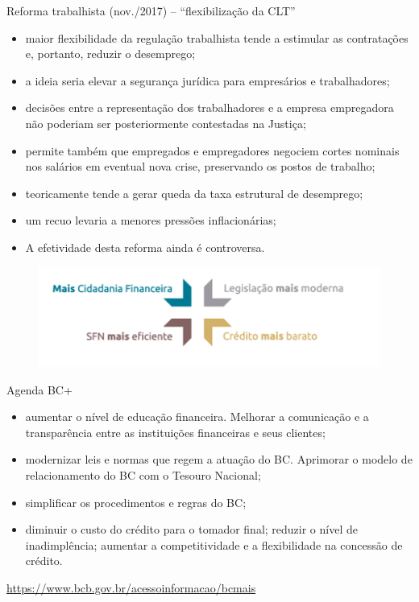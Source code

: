 \documentclass[a4paper,12pt]{article}[abntex2]
\begin{document}
Reforma trabalhista (nov./2017) – “flexibilização da CLT”\begin{itemize}
    \item maior flexibilidade da regulação trabalhista tende a estimular as contratações e, portanto, reduzir o desemprego;
    \item a ideia seria elevar a segurança jurídica para empresários e trabalhadores;
    \item decisões entre a representação dos trabalhadores e a empresa empregadora não poderiam ser posteriormente contestadas na Justiça;
    \item permite também que empregados e empregadores negociem cortes nominais nos salários em eventual nova crise, preservando os postos de trabalho;
    \item teoricamente tende a gerar queda da taxa estrutural de desemprego;
    \item um recuo levaria a menores pressões inflacionárias;
    \item A efetividade desta reforma ainda é controversa.
\end{itemize}

\begin{figure}[H]
    \centering
    \includegraphics[width=0.7\linewidth]{Imagens/a19i4.png}
\end{figure}

Agenda BC+\begin{itemize}
    \item aumentar o nível de educação financeira. Melhorar a comunicação e a transparência entre as instituições financeiras e seus clientes;
    \item modernizar leis e normas que regem a atuação do BC. Aprimorar o modelo de relacionamento do BC com o Tesouro Nacional;
    \item simplificar os procedimentos e regras do BC;
    \item diminuir o custo do crédito para o tomador final; reduzir o nível de inadimplência; aumentar a competitividade e a flexibilidade na concessão de crédito.
\end{itemize}

\url{https://www.bcb.gov.br/acessoinformacao/bcmais}
\end{document}

